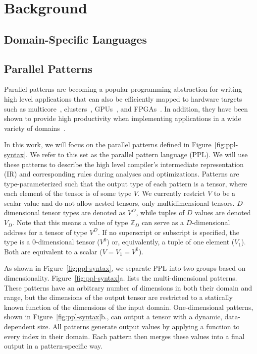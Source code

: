 \chapter{Background}
\label{background}

\section{Domain-Specific Languages}


\section{Parallel Patterns}
Parallel patterns are becoming a popular programming abstraction for writing
high level applications that can also be efficiently mapped to hardware
targets such as multicore~\cite{scala,haskell,delite-tecs14},
clusters~\cite{mapreduce,zaharia10spark,spartan},
GPUs~\cite{catanzaro11copperhead,micro14lee},
and FPGAs~\cite{auerbach10lime,george14fpl}. In addition, they have been shown
to provide high productivity when implementing applications in a wide variety
of domains~\cite{ecoop13sujeeth,pldi13halide}.



In this work, we will focus on the parallel patterns defined in Figure~\ref{fig:ppl-syntax}.
We refer to this set as the parallel pattern language (PPL).
We will use these patterns to describe the high level
compiler's intermediate representation (IR) and corresponding rules during analyses and optimizations.
Patterns are type-parameterized such that the output type of each pattern is a tensor, where each
element of the tensor is of some type $V$. We currently restrict $V$ to be a scalar value and
do not allow nested tensors, only multidimensional tensors.
$D$-dimensional tensor types are denoted as $V^D$, while tuples of $D$ values are
denoted $V_D$. Note that this means a value of type $\mathbb{Z}_D$ can serve as a $D$-dimensional address
for a tensor of type $V^D$.
If no superscript or subscript is specified, the type is a 0-dimensional tensor ($V^0$) or, equivalently, a tuple of one element ($V_1$).
Both are equivalent to a scalar ($V = V_1 = V^0$).

As shown in Figure~\ref{fig:ppl-syntax}, we separate PPL into two groups based on dimensionality.
Figure~\ref{fig:ppl-syntax}a. lists the multi-dimensional patterns.
These patterns have an arbitrary number of dimensions in both their domain and range,
but the dimensions of the output tensor
are restricted to a statically known function of the dimensions of the input domain.
One-dimensional patterns, shown in Figure~\ref{fig:ppl-syntax}b., can output a tensor with a dynamic, data-dependent size.
All patterns generate output values by applying a function to
every index in their domain. Each pattern then merges these values into a final
output in a pattern-specific way.

